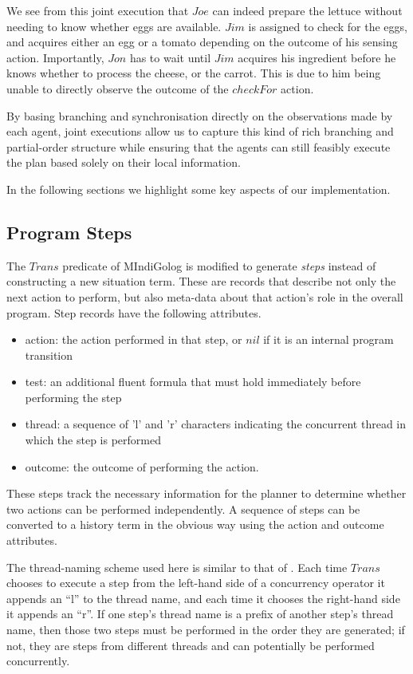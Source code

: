 \newpage{}

We see from this joint execution that $Joe$ can indeed prepare the
lettuce without needing to know whether eggs are available. $Jim$
is assigned to check for the eggs, and acquires either an egg or a
tomato depending on the outcome of his sensing action. Importantly,
$Jon$ has to wait until $Jim$ acquires his ingredient before he
knows whether to process the cheese, or the carrot. This is due to
him being unable to directly observe the outcome of the $checkFor$
action.

By basing branching and synchronisation directly on the observations
made by each agent, joint executions allow us to capture this kind
of rich branching and partial-order structure while ensuring that
the agents can still feasibly execute the plan based solely on their
local information.

In the following sections we highlight some key aspects of our implementation.


\subsection{Program Steps}

The $Trans$ predicate of MIndiGolog is modified to generate \emph{steps}
instead of constructing a new situation term. These are records that
describe not only the next action to perform, but also meta-data about
that action's role in the overall program. Step records have the following
attributes.

\begin{itemize}
\item action: the action performed in that step, or $nil$ if it is an internal
program transition 
\item test: an additional fluent formula that must hold immediately before
performing the step 
\item thread: a sequence of 'l' and 'r' characters indicating the concurrent
thread in which the step is performed 
\item outcome: the outcome of performing the action. 
\end{itemize}
These steps track the necessary information for the planner to determine
whether two actions can be performed independently. A sequence of
steps can be converted to a history term in the obvious way using
the action and outcome attributes.

The thread-naming scheme used here is similar to that of \citep{fritz08congolog_sin_trans}.
Each time $Trans$ chooses to execute a step from the left-hand side
of a concurrency operator it appends an {}``l'' to the thread name,
and each time it chooses the right-hand side it appends an {}``r''.
If one step's thread name is a prefix of another step's thread name,
then those two steps must be performed in the order they are generated;
if not, they are steps from different threads and can potentially
be performed concurrently.

